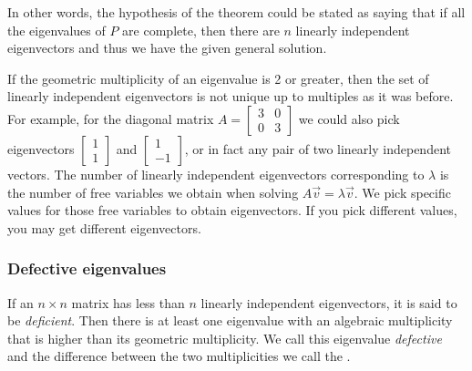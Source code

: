 \documentclass{ximera}
\begin{document}
In other words, the hypothesis of the theorem could be stated as saying that if all the eigenvalues of $P$ are complete, then there are $n$ linearly independent eigenvectors and thus we have the given general solution.

If the geometric multiplicity of an eigenvalue is 2 or greater, then the set of linearly independent eigenvectors is not unique up to multiples as it was before.  For example, for the diagonal matrix 
$A = \left[ \begin{smallmatrix} 3 & 0 \\ 0 & 3 \end{smallmatrix} \right]$
we could also pick eigenvectors 
$\left[ \begin{smallmatrix} 1 \\ 1 \end{smallmatrix} \right]$
and $\left[ \begin{smallmatrix} 1 \\ -1 \end{smallmatrix} \right]$, 
or in fact any pair of two linearly independent vectors.  The number of linearly independent eigenvectors corresponding to $\lambda$ is the number of free variables we obtain when solving $A\vec{v} = \lambda \vec{v}$.  We pick specific values for those free variables to obtain eigenvectors.  If you pick different values, you may get different eigenvectors.


\subsubsection{Defective eigenvalues}

If an $n \times n$ matrix has less than $n$ linearly independent eigenvectors, it is said to be \emph{deficient}. Then there is at least one eigenvalue with an algebraic multiplicity that is higher than its geometric multiplicity.  We call this eigenvalue \emph{defective} and the difference between the two multiplicities we call the \emph{}.
\end{document}
